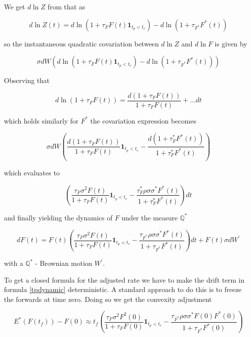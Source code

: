 \documentclass{amsart}
\theoremstyle{plain}
\numberwithin{equation}{section}
\begin{document}
We get $d\ln{Z}$ from that as

\begin{equation}
d\ln{Z(t)} = d\ln{(1+\tau_F F(t)\textbf{1}_{t_p < t_e})} - d\ln{(1+\tau_{F^*} F^*(t))}
\end{equation}

so the instantaneous quadratic covariation between $d\ln{Z}$ and $d\ln{F}$ is given by

\begin{equation}
\sigma dW (d\ln{(1+\tau_F F(t)\textbf{1}_{t_p < t_e})} - d\ln{(1+\tau_{F^*} F^*(t))})
\end{equation}

Observing that

\begin{equation}
d\ln(1+\tau_F F(t)) = \frac{d(1+\tau_F F(t))}{1+\tau_F F(t)} + \ldots dt
\end{equation}

which holds similarly for $F^*$ the covariation expression becomes

\begin{equation}
\sigma dW \left( \frac{d(1+\tau_F F(t))}{1+\tau_F F(t)}\textbf{1}_{t_p < t_e} - \frac{d(1+\tau_F^* F^*(t))}{1+\tau_F^* F^*(t)} \right) 
\end{equation}

which evaluates to

\begin{equation}
\left(\frac{\tau_F \sigma^2 F(t)}{1+\tau_F F(t)} \textbf{1}_{t_p<t_e} - \frac{\tau_F^* \rho\sigma\sigma^* F^*(t)}{1+\tau_F^* F^*(t)}\right) dt
\end{equation}

and finally yielding the dynamics of $F$ under the measure $\mathbb{Q}^*$

\begin{equation}\label{tpdynamic}
dF(t) = F(t) \left(\frac{\tau_F \sigma^2 F(t)}{1+\tau_F F(t)} \textbf{1}_{t_p<t_e} - \frac{\tau_{F^*} \rho\sigma\sigma^* F^*(t)}{1+\tau_{F^*} F^*(t)}\right) dt + F(t) \sigma dW^\prime
\end{equation}

with a $\mathbb{Q^*}$ - Brownian motion $W^\prime$.

To get a closed formula for the adjusted rate we have to make the drift term in formula \ref{tpdynamic} deterministic. A standard approach to do this
is to freeze the forwards at time zero. Doing so we get the convexity adjustment

\begin{equation}
E^*(F(t_f)) - F(0) \approx t_f \left(\frac{\tau_F \sigma^2 F^2(0)}{1+\tau_F F(0)} \textbf{1}_{t_p<t_e} - \frac{\tau_{F^*} \rho\sigma\sigma^*F(0) F^*(0)}{1+\tau_{F^*} F^*(0)}\right)
\end{equation}
\end{document}
